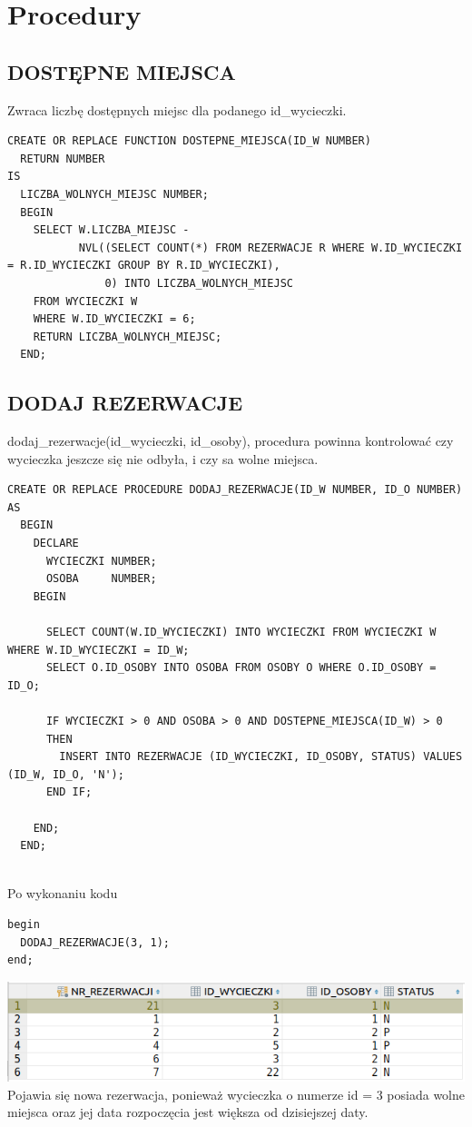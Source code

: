 \newpage
\section{Procedury}

\subsection{DOSTĘPNE MIEJSCA}
Zwraca liczbę dostępnych miejsc dla podanego id\_wycieczki.
\begin{verbatim}
CREATE OR REPLACE FUNCTION DOSTEPNE_MIEJSCA(ID_W NUMBER)
  RETURN NUMBER
IS
  LICZBA_WOLNYCH_MIEJSC NUMBER;
  BEGIN
    SELECT W.LICZBA_MIEJSC -
           NVL((SELECT COUNT(*) FROM REZERWACJE R WHERE W.ID_WYCIECZKI = R.ID_WYCIECZKI GROUP BY R.ID_WYCIECZKI),
               0) INTO LICZBA_WOLNYCH_MIEJSC
    FROM WYCIECZKI W
    WHERE W.ID_WYCIECZKI = 6;
    RETURN LICZBA_WOLNYCH_MIEJSC;
  END;
\end{verbatim}

\subsection{DODAJ REZERWACJE}
dodaj\_rezerwacje(id\_wycieczki, id\_osoby), procedura powinna kontrolować czy wycieczka
jeszcze się nie odbyła, i czy sa wolne miejsca.

\begin{verbatim}
CREATE OR REPLACE PROCEDURE DODAJ_REZERWACJE(ID_W NUMBER, ID_O NUMBER)
AS
  BEGIN
    DECLARE
      WYCIECZKI NUMBER;
      OSOBA     NUMBER;
    BEGIN

      SELECT COUNT(W.ID_WYCIECZKI) INTO WYCIECZKI FROM WYCIECZKI W WHERE W.ID_WYCIECZKI = ID_W;
      SELECT O.ID_OSOBY INTO OSOBA FROM OSOBY O WHERE O.ID_OSOBY = ID_O;

      IF WYCIECZKI > 0 AND OSOBA > 0 AND DOSTEPNE_MIEJSCA(ID_W) > 0
      THEN
        INSERT INTO REZERWACJE (ID_WYCIECZKI, ID_OSOBY, STATUS) VALUES (ID_W, ID_O, 'N');
      END IF;

    END;
  END;
\end{verbatim}\\

Po wykonaniu kodu
\begin{verbatim}
begin
  DODAJ_REZERWACJE(3, 1);
end;
\end{verbatim}
\includegraphics[width=\linewidth]{./images/dodaj_rezerwacje.png}
Pojawia się nowa rezerwacja, ponieważ wycieczka o numerze id = 3 posiada wolne miejsca oraz jej 
data rozpoczęcia jest większa od dzisiejszej daty.

